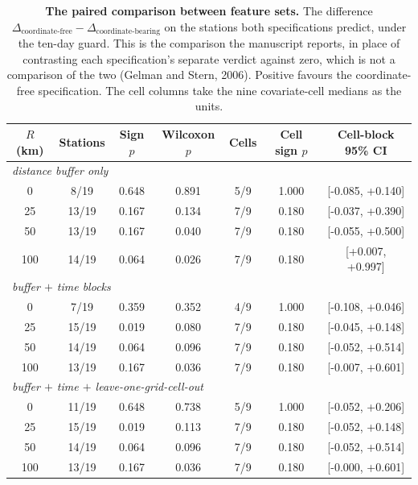 \documentclass[11pt]{article}
\begin{document}
\begin{table}[htbp]\centering\footnotesize
\caption{\textbf{The paired comparison between feature sets.} The difference $\Delta_{\text{coordinate-free}}-\Delta_{\text{coordinate-bearing}}$ on the stations both specifications predict, under the ten-day guard. This is the comparison the manuscript reports, in place of contrasting each specification's separate verdict against zero, which is not a comparison of the two (Gelman and Stern, 2006). Positive favours the coordinate-free specification. The cell columns take the nine covariate-cell medians as the units.}
\label{si:t34}
\begin{tabular}{ccccccc}\toprule
$R$ (km) & Stations & Sign $p$ & Wilcoxon $p$ & Cells & Cell sign $p$ & Cell-block 95\% CI \\ \midrule
\multicolumn{7}{l}{\textit{distance buffer only}} \\
0 & 8/19 & 0.648 & 0.891 & 5/9 & 1.000 & [-0.085, +0.140] \\
25 & 13/19 & 0.167 & 0.134 & 7/9 & 0.180 & [-0.037, +0.390] \\
50 & 13/19 & 0.167 & 0.040 & 7/9 & 0.180 & [-0.055, +0.500] \\
100 & 14/19 & 0.064 & 0.026 & 7/9 & 0.180 & [+0.007, +0.997] \\
\multicolumn{7}{l}{\textit{buffer $+$ time blocks}} \\
0 & 7/19 & 0.359 & 0.352 & 4/9 & 1.000 & [-0.108, +0.046] \\
25 & 15/19 & 0.019 & 0.080 & 7/9 & 0.180 & [-0.045, +0.148] \\
50 & 14/19 & 0.064 & 0.096 & 7/9 & 0.180 & [-0.052, +0.514] \\
100 & 13/19 & 0.167 & 0.036 & 7/9 & 0.180 & [-0.007, +0.601] \\
\multicolumn{7}{l}{\textit{buffer $+$ time $+$ leave-one-grid-cell-out}} \\
0 & 11/19 & 0.648 & 0.738 & 5/9 & 1.000 & [-0.052, +0.206] \\
25 & 15/19 & 0.019 & 0.113 & 7/9 & 0.180 & [-0.052, +0.148] \\
50 & 14/19 & 0.064 & 0.096 & 7/9 & 0.180 & [-0.052, +0.514] \\
100 & 13/19 & 0.167 & 0.036 & 7/9 & 0.180 & [-0.000, +0.601] \\
\bottomrule\end{tabular}\end{table}
\end{document}
